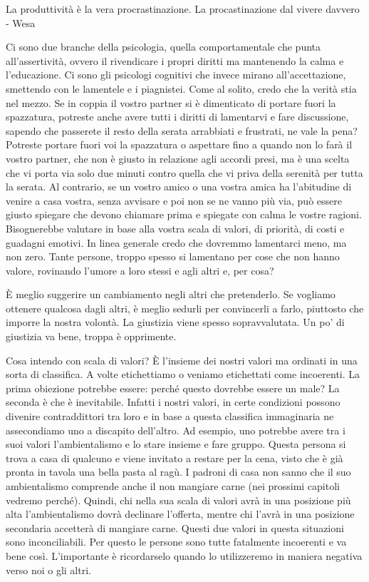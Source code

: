 \documentclass[12pt]{book} %
\begin{document}
La produttività è la vera procrastinazione. La procastinazione dal vivere davvero - Wesa 

Ci sono due branche della psicologia, quella comportamentale che punta all'assertività, ovvero il
rivendicare i propri diritti ma mantenendo la calma e l'educazione. Ci sono gli psicologi
cognitivi che invece mirano all'accettazione, smettendo con le lamentele e i piagnistei. Come al
solito, credo che la verità stia nel mezzo. Se in coppia il vostro partner si è dimenticato di portare fuori la
spazzatura, potreste anche avere tutti i diritti di lamentarvi e fare discussione, sapendo che passerete il resto della
serata arrabbiati e frustrati, ne vale la pena? Potreste portare fuori voi la spazzatura o aspettare fino a quando non
lo farà il vostro partner, che non è giusto in relazione agli accordi presi, ma è una scelta che vi porta via solo due
minuti contro quella che vi priva della serenità per tutta la serata. Al contrario, se un vostro amico o una vostra
amica ha l'abitudine di venire a casa vostra, senza avvisare e poi non se ne vanno più via, può
essere giusto spiegare che devono chiamare prima e spiegate con calma le vostre ragioni. Bisognerebbe valutare in base
alla vostra scala di valori, di priorità, di costi e guadagni emotivi. In linea generale credo che dovremmo lamentarci
meno, ma non zero. Tante persone, troppo spesso si lamentano per cose che non hanno valore, rovinando
l'umore a loro stessi e agli altri e, per cosa?

È meglio suggerire un cambiamento negli altri che pretenderlo. Se vogliamo ottenere qualcosa dagli altri, è meglio
sedurli per convincerli a farlo, piuttosto che imporre la nostra volontà. La giustizia viene spesso sopravvalutata. Un
po' di giustizia va bene, troppa è opprimente.


\bigskip

Cosa intendo con scala di valori? È l'insieme dei nostri valori ma ordinati in una sorta di
classifica. A volte etichettiamo o veniamo etichettati come incoerenti. La prima obiezione potrebbe essere: perché
questo dovrebbe essere un male? La seconda è che è inevitabile. Infatti i nostri valori, in certe condizioni possono
divenire contraddittori tra loro e in base a questa classifica immaginaria ne assecondiamo uno a discapito
dell'altro. Ad esempio, uno potrebbe avere tra i suoi valori l'ambientalismo
e lo stare insieme e fare gruppo. Questa persona si trova a casa di qualcuno e viene invitato a restare per la cena,
visto che è già pronta in tavola una bella pasta al ragù. I padroni di casa non sanno che il suo ambientalismo
comprende anche il non mangiare carne (nei prossimi capitoli vedremo perché). Quindi, chi nella sua scala di valori
avrà in una posizione più alta l'ambientalismo dovrà declinare l'offerta,
mentre chi l'avrà in una posizione secondaria accetterà di mangiare carne. Questi due valori in
questa situazioni sono inconciliabili. Per questo le persone sono tutte fatalmente incoerenti e va bene così.
L'importante è ricordarselo quando lo utilizzeremo in maniera negativa verso noi o gli altri.
\end{document}
